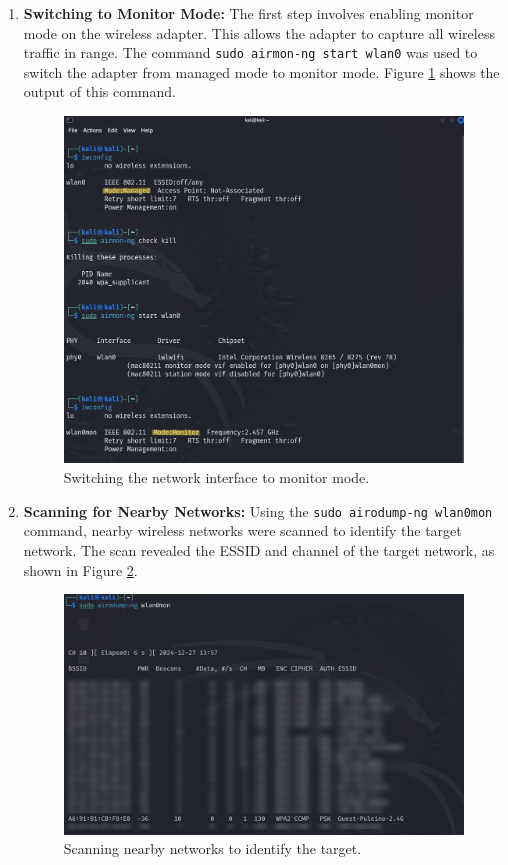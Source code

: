 \begin{enumerate}
    \item \textbf{Switching to Monitor Mode:} The first step involves enabling monitor mode on the wireless adapter. This allows the adapter to capture all wireless traffic in range. The command \texttt{sudo airmon-ng start wlan0} was used to switch the adapter from managed mode to monitor mode. Figure \ref{fig:monitor_mode} shows the output of this command.
    
    \begin{figure}[h!]
        \centering
        \includegraphics[width=0.8\linewidth]{images/wlanmon.png}
        \caption{Switching the network interface to monitor mode.}
        \label{fig:monitor_mode}
    \end{figure}

    \item \textbf{Scanning for Nearby Networks:} Using the \texttt{sudo airodump-ng wlan0mon} command, nearby wireless networks were scanned to identify the target network. The scan revealed the ESSID and channel of the target network, as shown in Figure \ref{fig:network_scan}.
    
    \begin{figure}[h!]
        \centering
        \includegraphics[width=0.8\linewidth]{images/networklist2.png}
        \caption{Scanning nearby networks to identify the target.}
        \label{fig:network_scan}
    \end{figure}


\end{enumerate}
